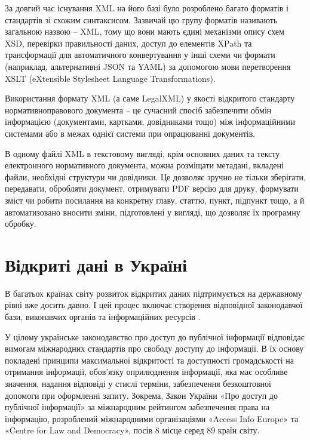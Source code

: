 За довгий час існування XML на його базі було розроблено багато форматів і стандартів зі
схожим синтаксисом. Зазвичай цю групу форматів називають загальною назвою – XML,
тому що вони мають єдині механізми опису схем XSD,
перевірки правильності даних, доступ до елементів XPath та трансформації для автоматичного конвертування
у інші схеми чи формати (наприклад, альтернативні JSON та YAML) за допомогою мови
перетворення XSLT (eXtensible Stylesheet Language Transformations).

Використання формату XML (а саме LegalXML) у якості відкритого стандарту
нормативноправового документа – це сучасний спосіб забезпечити обмін інформацією (документами,
картками, довідниками тощо) між інформаційними системами або в межах однієї системи
при опрацюванні документів.

В одному файлі XML в текстовому вигляді, крім основних даних та тексту електронного
нормативного документа, можна розміщати метадані, вкладені файли,
необхідні структури чи довідники. Це дозволяє зручно не тільки зберігати,
передавати, обробляти документ, отримувати PDF версію для друку, формувати зміст чи
робити посилання на конкретну главу, статтю, пункт, підпункт тощо, а й автоматизовано
вносити зміни, підготовлені у вигляді, що дозволяє їх програмну обробку.

\section{Відкриті дані в Україні}

В багатьох країнах світу розвиток відкритих даних підтримується на державному рівні вже досить давно.
І цей процес включає створення відповідної законодавчої бази, виконавчих органів та інформаційних ресурсів \cite{BeyondTransparency}.

У цілому українське законодавство про доступ до публічної
інформації відповідає вимогам міжнародних стандартів про свободу доступу до інформації. 
В їх основу покладені принципи максимальної відкритості та доступності громадськості на отримання інформації, 
обов'язку оприлюднення інформації, яка має особливе значення,
надання відповіді у стислі терміни, забезпечення безкоштовної допомоги при оформленні запиту. Зокрема, Закон України «Про
доступ до публічної інформації» за міжнародним рейтингом забезпечення права на інформацію,
розроблений міжнародними організаціями «Access Info Europe» та «Centre for Law and Democracy»,
посів 8 місце серед 89 країн світу.

